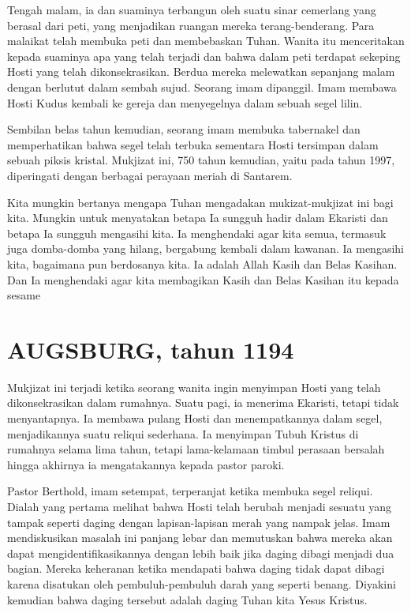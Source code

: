 Tengah malam, ia dan suaminya terbangun oleh suatu sinar cemerlang yang berasal dari peti, yang menjadikan ruangan mereka terang-benderang. Para malaikat telah membuka peti dan membebaskan Tuhan. Wanita itu menceritakan kepada suaminya apa yang telah terjadi dan bahwa dalam peti terdapat sekeping Hosti yang telah dikonsekrasikan. Berdua mereka melewatkan sepanjang malam dengan berlutut dalam sembah sujud. Seorang imam dipanggil. Imam membawa Hosti Kudus kembali ke gereja dan menyegelnya dalam sebuah segel lilin.

Sembilan belas tahun kemudian, seorang imam membuka tabernakel dan memperhatikan bahwa segel telah terbuka sementara Hosti tersimpan dalam sebuah piksis kristal. Mukjizat ini, 750 tahun kemudian, yaitu pada tahun 1997, diperingati dengan berbagai perayaan meriah di Santarem.

Kita mungkin bertanya mengapa Tuhan mengadakan mukizat-mukjizat ini bagi kita. Mungkin untuk menyatakan betapa Ia sungguh hadir dalam Ekaristi dan betapa Ia sungguh mengasihi kita. Ia menghendaki agar kita semua, termasuk juga domba-domba yang hilang, bergabung kembali dalam kawanan. Ia mengasihi kita, bagaimana pun berdosanya kita. Ia adalah Allah Kasih dan Belas Kasihan. Dan Ia menghendaki agar kita membagikan Kasih dan Belas Kasihan itu kepada sesame

\section{AUGSBURG, tahun 1194}
Mukjizat ini terjadi ketika seorang wanita ingin menyimpan Hosti yang telah dikonsekrasikan dalam rumahnya. Suatu pagi, ia menerima Ekaristi, tetapi tidak menyantapnya. Ia membawa pulang Hosti dan menempatkannya dalam segel, menjadikannya suatu reliqui sederhana. Ia menyimpan Tubuh Kristus di rumahnya selama lima tahun, tetapi lama-kelamaan timbul perasaan bersalah hingga akhirnya ia mengatakannya kepada pastor paroki.

Pastor Berthold, imam setempat, terperanjat ketika membuka segel reliqui. Dialah yang pertama melihat bahwa Hosti telah berubah menjadi sesuatu yang tampak seperti daging dengan lapisan-lapisan merah yang nampak jelas. Imam mendiskusikan masalah ini panjang lebar dan memutuskan bahwa mereka akan dapat mengidentifikasikannya dengan lebih baik jika daging dibagi menjadi dua bagian. Mereka keheranan ketika mendapati bahwa daging tidak dapat dibagi karena disatukan oleh pembuluh-pembuluh darah yang seperti benang. Diyakini kemudian bahwa daging tersebut adalah daging Tuhan kita Yesus Kristus.


